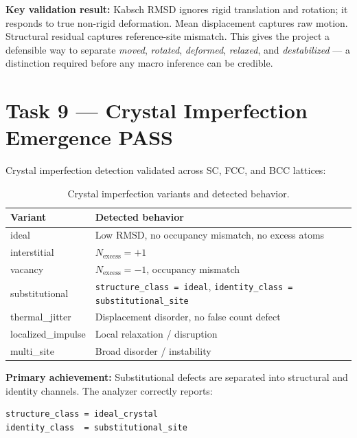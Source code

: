\documentclass[11pt,a4paper]{article}
\newcommand{\statpass}{\textbf{\textcolor{passgreen}{PASS}}}
\begin{document}
\textbf{Key validation result:} Kabsch RMSD ignores rigid translation and rotation; it responds
to true non-rigid deformation. Mean displacement captures raw motion. Structural residual
captures reference-site mismatch. This gives the project a defensible way to separate
\emph{moved}, \emph{rotated}, \emph{deformed}, \emph{relaxed}, and \emph{destabilized} ---
a distinction required before any macro inference can be credible.

\section{Task 9 --- Crystal Imperfection Emergence \hfill\statpass}

Crystal imperfection detection validated across SC, FCC, and BCC lattices:

\begin{table}[h!]
\centering
\begin{tabularx}{\linewidth}{lX}
\toprule
\textbf{Variant} & \textbf{Detected behavior} \\
\midrule
ideal            & Low RMSD, no occupancy mismatch, no excess atoms \\
interstitial     & $N_\text{excess} = +1$ \\
vacancy          & $N_\text{excess} = -1$, occupancy mismatch \\
substitutional   & \texttt{structure\_class = ideal}, \texttt{identity\_class = substitutional\_site} \\
thermal\_jitter  & Displacement disorder, no false count defect \\
localized\_impulse & Local relaxation / disruption \\
multi\_site      & Broad disorder / instability \\
\bottomrule
\end{tabularx}
\caption{Crystal imperfection variants and detected behavior.}
\end{table}

\textbf{Primary achievement:} Substitutional defects are separated into structural and identity
channels. The analyzer correctly reports:

\begin{lstlisting}
structure_class = ideal_crystal
identity_class  = substitutional_site
\end{lstlisting}
\end{document}
